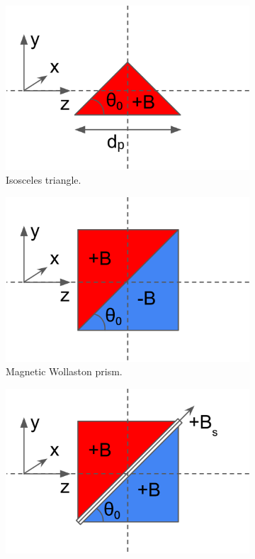 \begin{figure}[htbp]
	\centering
	\begin{subfigure}[b]{0.3\textwidth}
		\centering
		\includegraphics[width=\textwidth]{iso-schematic}
		\caption{Isosceles triangle.}
		\label{fig:precession-devices:iso}
	\end{subfigure}
	\hfill
	\begin{subfigure}[b]{0.3\textwidth}
		\centering
		\includegraphics[width=\textwidth]{wp-schematic}
		\caption{Magnetic Wollaston prism.}
		\label{fig:precession-devices:wsp}
	\end{subfigure}
	\hfill
	\begin{subfigure}[b]{0.3\textwidth}
		\centering
		\includegraphics[width=\textwidth]{foil-schematic}

\end{subfigure}
\end{figure}
